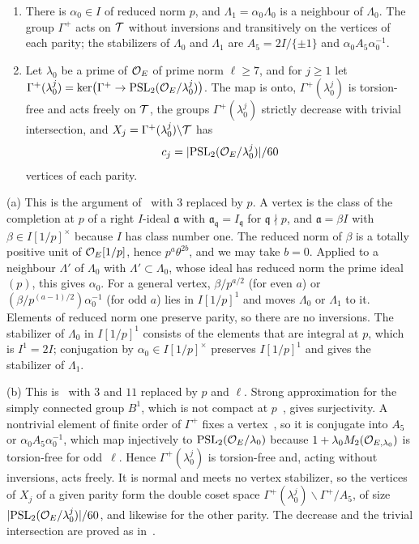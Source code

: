 \begin{lemma}\label{lem:group}
\notformalized
\begin{enumerate}[label=(\alph*)]
\item There is $\alpha_0\in I$ of reduced norm $p$, and $\Lambda_1=\alpha_0\Lambda_0$ is a neighbour of $\Lambda_0$.
The group $\Gamma^+$ acts on $\mathcal{T}$ without inversions and transitively on the vertices of each parity; the stabilizers
of $\Lambda_0$ and $\Lambda_1$ are $A_5=2I/\{\pm1\}$ and $\alpha_0A_5\alpha_0^{-1}$.
\item Let $\lambda_0$ be a prime of $\mathcal{O}_E$ of prime norm $\ell\ge7$, and for $j\ge1$ let
$\Gamma^+(\lambda_0^j)=\ker\bigl(\Gamma^+\to\operatorname{PSL}_2(\mathcal{O}_E/\lambda_0^j)\bigr)$. The map is onto,
$\Gamma^+(\lambda_0^j)$ is torsion-free and acts freely on $\mathcal{T}$, the groups $\Gamma^+(\lambda_0^j)$ strictly decrease
with trivial intersection, and $X_j=\Gamma^+(\lambda_0^j)\backslash\mathcal{T}$ has
\[
  c_j=\lvert \operatorname{PSL}_2(\mathcal{O}_E/\lambda_0^j) \rvert/60
\]
vertices of each parity.
\end{enumerate}
\end{lemma}
\begin{informalproof}
(a) This is the argument of~\cite[Lemma~6.2]{Luck2026} with $3$ replaced by $p$. A vertex is the class of the completion
at $p$ of a right $I$-ideal $\mathfrak a$ with $\mathfrak a_{\mathfrak q}=I_{\mathfrak q}$ for $\mathfrak q\nmid p$, and
$\mathfrak a=\beta I$ with $\beta\in I[1/p]^\times$ because $I$ has class number one. The reduced norm of $\beta$ is a
totally positive unit of $\mathcal{O}_E[1/p]$, hence $p^a\theta^{2b}$, and we may take $b=0$. Applied to a neighbour $\Lambda'$ of
$\Lambda_0$ with $\Lambda'\subset\Lambda_0$, whose ideal has reduced norm the prime ideal $(p)$, this gives $\alpha_0$.
For a general vertex, $\beta/p^{a/2}$ (for even $a$) or $(\beta/p^{(a-1)/2})\alpha_0^{-1}$ (for odd $a$) lies in
$I[1/p]^1$ and moves $\Lambda_0$ or $\Lambda_1$ to it. Elements of reduced norm one preserve parity, so there are no
inversions. The stabilizer of $\Lambda_0$ in $I[1/p]^1$ consists of the elements that are integral at $p$, which is
$I^1=2I$; conjugation by $\alpha_0\in I[1/p]^\times$ preserves $I[1/p]^1$ and gives the stabilizer of $\Lambda_1$.

(b) This is~\cite[Lemma~6.3]{Luck2026} with $3$ and $11$ replaced by $p$ and $\ell$. Strong approximation for the
simply connected group $B^1$, which is not compact at $p$~\cite[Section~7.4]{PlatonovRapinchuk1994}, gives
surjectivity. A nontrivial element of finite order of $\Gamma^+$ fixes a vertex~\cite[Section~I.4]{Serre1980}, so it is
conjugate into $A_5$ or $\alpha_0A_5\alpha_0^{-1}$, which map injectively to $\operatorname{PSL}_2(\mathcal{O}_E/\lambda_0)$ because
$1+\lambda_0M_2(\mathcal{O}_{E,\lambda_0})$ is torsion-free for odd~$\ell$. Hence $\Gamma^+(\lambda_0^j)$ is torsion-free and,
acting without inversions, acts freely. It is normal and meets no vertex stabilizer, so the vertices of $X_j$ of a given
parity form the double coset space $\Gamma^+(\lambda_0^j)\backslash\Gamma^+/A_5$, of size
$\lvert \operatorname{PSL}_2(\mathcal{O}_E/\lambda_0^j) \rvert/60$, and likewise for the other parity. The decrease and the trivial intersection are
proved as in~\cite[Lemma~6.3]{Luck2026}.
\end{informalproof}

